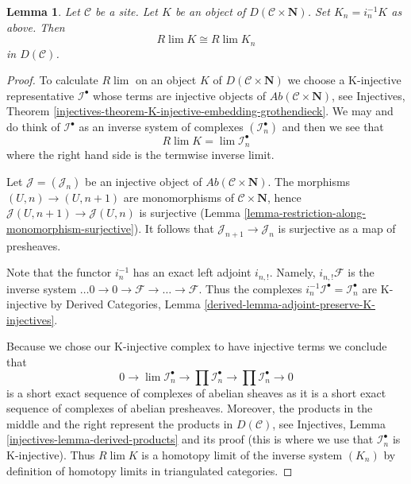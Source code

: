 \documentclass[10pt,a4paper]{amsart}
\theoremstyle{plain}
\newtheorem{lemma}[subsection]{Lemma}
\theoremstyle{definition}
\theoremstyle{remark}
\numberwithin{equation}{subsection}
\def\lim{\mathop{\mathrm{lim}}\nolimits}
\begin{document}
\begin{lemma}
\label{lemma-derived-limit-is-ok}
Let $\mathcal{C}$ be a site. Let $K$ be an object of
$D(\mathcal{C} \times \mathbf{N})$. Set $K_n = i_n^{-1}K$ as above.
Then
$$
R\lim K \cong R\lim K_n
$$
in $D(\mathcal{C})$.
\end{lemma}

\begin{proof}
To calculate $R\lim$ on an object $K$ of $D(\mathcal{C} \times \mathbf{N})$
we choose a K-injective representative $\mathcal{I}^\bullet$ whose terms are
injective objects of $\textit{Ab}(\mathcal{C} \times \mathbf{N})$, see
Injectives, Theorem
\ref{injectives-theorem-K-injective-embedding-grothendieck}.
We may and do think of $\mathcal{I}^\bullet$ as an inverse system of
complexes $(\mathcal{I}_n^\bullet)$ and then we see that
$$
R\lim K = \lim \mathcal{I}_n^\bullet
$$
where the right hand side is the termwise inverse limit.

\medskip\noindent
Let $\mathcal{J} = (\mathcal{J}_n)$ be an injective object of
$\textit{Ab}(\mathcal{C} \times \mathbf{N})$. The morphisms
$(U, n) \to (U, n + 1)$ are monomorphisms of
$\mathcal{C} \times \mathbf{N}$, hence
$\mathcal{J}(U, n + 1) \to \mathcal{J}(U, n)$ is surjective
(Lemma \ref{lemma-restriction-along-monomorphism-surjective}).
It follows that $\mathcal{J}_{n + 1} \to \mathcal{J}_n$ is
surjective as a map of presheaves.

\medskip\noindent
Note that the functor $i_n^{-1}$ has an exact left adjoint $i_{n, !}$.
Namely, $i_{n, !}\mathcal{F}$ is the inverse system
$\ldots 0 \to 0 \to \mathcal{F} \to \ldots \to \mathcal{F}$.
Thus the complexes $i_n^{-1}\mathcal{I}^\bullet = \mathcal{I}_n^\bullet$
are K-injective by
Derived Categories, Lemma \ref{derived-lemma-adjoint-preserve-K-injectives}.

\medskip\noindent
Because we chose our K-injective complex to have injective terms
we conclude that
$$
0 \to  \lim \mathcal{I}_n^\bullet \to \prod \mathcal{I}_n^\bullet
\to \prod \mathcal{I}_n^\bullet \to 0
$$
is a short exact sequence of complexes of abelian sheaves as it
is a short exact sequence of complexes of abelian presheaves.
Moreover, the products in the middle and the right represent
the products in $D(\mathcal{C})$, see
Injectives, Lemma \ref{injectives-lemma-derived-products} and its
proof (this is where we use that $\mathcal{I}_n^\bullet$ is K-injective).
Thus $R\lim K$ is a homotopy limit of the inverse system $(K_n)$
by definition of homotopy limits in triangulated categories.
\end{proof}
\end{document}
